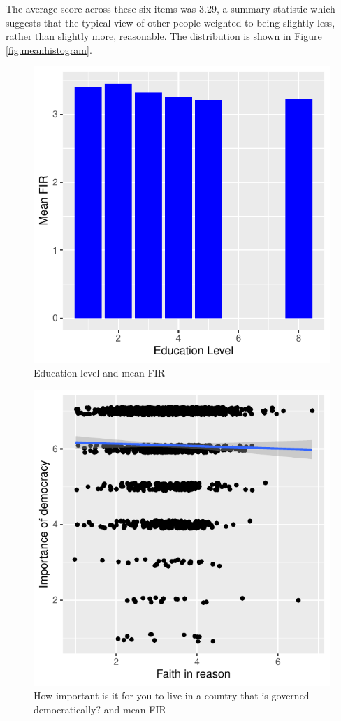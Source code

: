 \documentclass[
  ,jou,floatsintext]{apa6}
\begin{document}
The average score across these six items was 3.29, a summary statistic which suggests that the typical view of other people weighted to being slightly less, rather than slightly more, reasonable. The distribution is shown in Figure \ref{fig:meanhistogram}.

\begin{figure}

{\centering \includegraphics[width=0.75\linewidth]{faithinreason_files/figure-latex/education-1} 

}

\caption{Education level and mean FIR}\label{fig:education}
\end{figure}
\begin{figure}

{\centering \includegraphics[width=0.75\linewidth]{faithinreason_files/figure-latex/democract-1} 

}

\caption{How important is it for you to live in a country that is governed democratically? and mean FIR}\label{fig:democract}
\end{figure}
\end{document}
